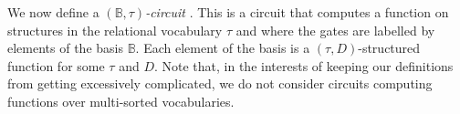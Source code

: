 \documentclass[../paper.tex]{subfiles}
\begin{document}



We now define a \emph{$(\mathbb{B}, \tau)$-circuit} . This is a circuit that
computes a function on structures in the relational vocabulary $\tau$ and where
the gates are labelled by elements of the basis $\mathbb{B}$. Each element of
the basis is a $(\tau,D)$-structured function for some $\tau$ and $D$. Note
that, in the interests of keeping our definitions from getting excessively
complicated, we do not consider circuits computing functions over multi-sorted
vocabularies.
\end{document}
